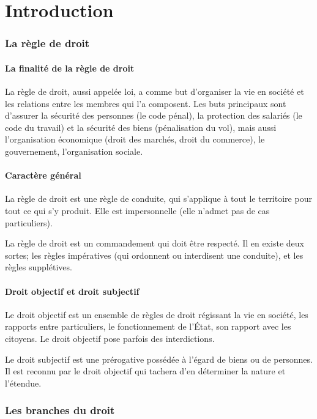 \documentclass[10pt,a4paper]{article}
\begin{document}
\part{Introduction}

\section{La règle de droit}

\subsection{La finalité de la règle de droit}

La règle de droit, aussi appelée loi, a comme but d'organiser la vie en société et les relations entre les membres qui l'a composent. Les buts principaux sont d'assurer la sécurité des personnes (le code pénal), la protection des salariés (le code du travail) et la sécurité des biens (pénalisation du vol), mais aussi l'organisation économique (droit des marchés, droit du commerce), le gouvernement, l'organisation sociale.

\subsection{Caractère général}

La règle de droit est une règle de conduite, qui s'applique à tout le territoire pour tout ce qui s'y produit. Elle est impersonnelle (elle n'admet pas de cas particuliers).

La règle de droit est un commandement qui doit être respecté. Il en existe deux sortes; les règles impératives (qui ordonnent ou interdisent une conduite), et les règles supplétives.

\subsection{Droit objectif et droit subjectif}

Le droit objectif est un ensemble de règles de droit régissant la vie en société, les rapports entre particuliers, le fonctionnement de l'État, son rapport avec les citoyens. Le droit objectif pose parfois des interdictions.

Le droit subjectif est une prérogative possédée à l'égard de biens ou de personnes. Il est reconnu par le droit objectif qui tachera d'en déterminer la nature et l'étendue.

\section{Les branches du droit}
\end{document}
